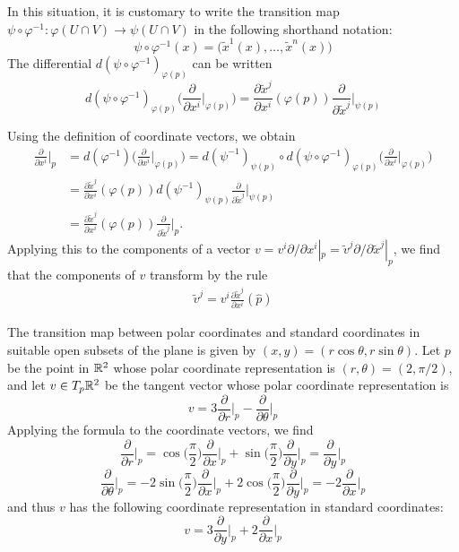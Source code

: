 In this situation, it is customary to write the transition map $\psi\circ\varphi^{-1}:\varphi(U\cap V)\to\psi(U\cap V)$ in the following shorthand notation:
\[\psi\circ\varphi^{-1}(x)=\big(\widetilde{x}^1(x),\dots,\widetilde{x}^n(x)\big)\]
The differential $d(\psi\circ\varphi^{-1})_{\varphi(p)}$ can be written
\[d(\psi\circ\varphi^{-1})_{\varphi(p)}\Big(\frac{\partial}{\partial x^i}\Big|_{\varphi(p)}\Big)=\frac{\partial\widetilde{x}^j}{\partial x^i}(\varphi(p))\frac{\partial}{\partial\widetilde{x}^j}\Big|_{\psi(p)}\]

Using the definition of coordinate vectors, we obtain
\begin{align*}
\frac{\partial}{\partial x^i}\Big|_p&=d(\varphi^{-1})\Big(\frac{\partial}{\partial x^i}\Big|_{\varphi(p)}\Big)=d(\psi^{-1})_{\psi(p)}\circ d(\psi\circ\varphi^{-1})_{\varphi(p)}\Big(\frac{\partial}{\partial x^i}\Big|_{\varphi(p)}\Big)\\
&=\frac{\partial\widetilde{x}^j}{\partial x^i}(\varphi(p))d(\psi^{-1})_{\psi(p)}\frac{\partial}{\partial\widetilde{x}^j}\Big|_{\psi(p)}\\
&=\frac{\partial\widetilde{x}^j}{\partial x^i}(\varphi(p))\frac{\partial}{\partial\widetilde{x}^j}\Big|_{p}.
\end{align*}
Applying this to the components of a vector $v=v^i\partial/\partial x^i|_p=\widetilde{v}^j\partial/\partial\widetilde{x}^j|_p$, we find that the components of $v$ transform by the rule
\begin{align}\label{coordinate change-1}
\widetilde{v}^j=v^i\frac{\partial\widetilde{x}^j}{\partial x^i}(\widehat{p})
\end{align}
\begin{example}
The transition map between polar coordinates and standard coordinates
in suitable open subsets of the plane is given by $(x,y)=(r\cos\theta,r\sin\theta)$. Let $p$ be the point in $\mathbb{R}^2$ whose polar coordinate representation is $(r,\theta)=(2,\pi/2)$, and let $v\in T_p\mathbb{R}^2$ be the tangent vector whose polar coordinate representation is 
\[v=3\frac{\partial}{\partial r}\Big|_p-\frac{\partial}{\partial\theta}\Big|_p\]
Applying the formula to the coordinate vectors, we find
\[\frac{\partial}{\partial r}\Big|_p=\cos\Big(\frac{\pi}{2}\Big)\frac{\partial}{\partial x}\Big|_p+\sin\Big(\frac{\pi}{2}\Big)\frac{\partial}{\partial y}\Big|_p=\frac{\partial}{\partial y}\Big|_p\]
\[\frac{\partial}{\partial\theta}\Big|_p=-2\sin\Big(\frac{\pi}{2}\Big)\frac{\partial}{\partial x}\Big|_p+2\cos\Big(\frac{\pi}{2}\Big)\frac{\partial}{\partial y}\Big|_p=-2\frac{\partial}{\partial x}\Big|_p\]
and thus $v$ has the following coordinate representation in standard coordinates:
\[v=3\frac{\partial}{\partial y}\Big|_p+2\frac{\partial}{\partial x}\Big|_p\]
\end{example}
